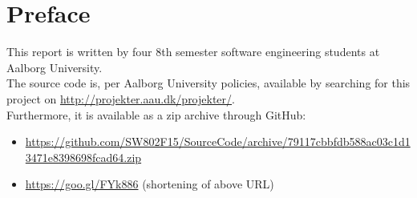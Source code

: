 \chapter{Preface}
This report is written by four 8th semester software engineering students at Aalborg University.\\

\noindent The source code is, per Aalborg University policies, available by searching for this project on \url{http://projekter.aau.dk/projekter/}.\\

\noindent Furthermore, it is available as a zip archive through GitHub:

\begin{itemize}
\item \parbox{.8\textwidth}{\url{https://github.com/SW802F15/SourceCode/archive/79117cbbfdb588ac03c1d13471e8398698fcad64.zip}}
\item \url{https://goo.gl/FYk886} (shortening of above URL)
\end{itemize}
















\vspace{5cm}
\noindent 